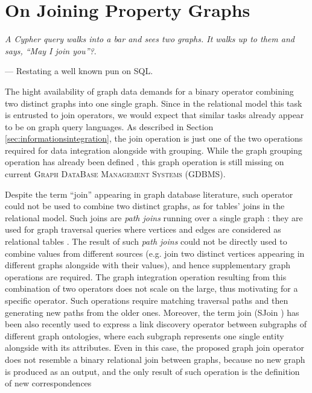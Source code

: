 \chapter{On Joining Property Graphs}\label{cha:join}
\epigraph{\textit{A Cypher query walks into a bar and sees two graphs. It walks up to them and says, ``May I join you''?}.}{--- Restating a well known pun on SQL.}

The hight availability of graph data demands for a binary operator combining two distinct graphs into one single graph.
Since in the relational model this task is entrusted to join operators, we would expect that similar
tasks already appear to be on graph query languages. As described in Section \ref{sec:informationsintegration}, the join operation is just one of the two operations required for data integration alongside with grouping. While the graph grouping operation has already been defined \cite{JunghannsPR17}, this graph operation is still missing on current \textsc{Graph DataBase Management Systems} (GDBMS).

Despite the term ``join'' appearing in graph database literature, such operator could not be used to
combine two distinct graphs, as for tables' joins in the relational model. Such joins are
\textit{path joins} running over a single graph  \cite{Aberger}: they are used for graph
traversal queries \cite{Gao,MartonSV17} where vertices and edges are considered as relational
tables \cite{SQLGraph,Neo4jAlg}.
The result of such \textit{path joins} could not be directly used to combine values from different sources (e.g. join
two distinct vertices appearing in different graphs alongside with their values), and hence supplementary
graph operations are required.
The graph integration operation resulting from this combination
of two operators does not scale on the large, thus motivating for a specific operator.
Such operations require matching traversal paths and then generating new paths from the older ones. Moreover, the term join (SJoin \cite{SJoin}) has been also recently used to express a link discovery operator between subgraphs of different graph ontologies, where each subgraph represents one single entity alongside with its attributes. Even in this case, the proposed graph join operator does not resemble a binary relational join between graphs, because no new graph is produced as an output, and the only result of such operation is the definition of new correspondences


